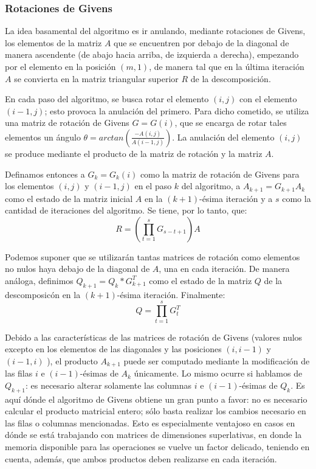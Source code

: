 \documentclass[journal, monochrome]{IEEEtran}
\begin{document}
\vspace{0.5cm}
\subsubsection{Rotaciones de Givens}
\par
La idea basamental del algoritmo es ir anulando, mediante rotaciones de Givens, los elementos de la matriz $A$ que se encuentren por debajo de la diagonal
de manera ascendente (de abajo hacia arriba, de izquierda a derecha), empezando por el elemento en la posición $(m,1)$, de manera
tal que en la última iteración $A$ se convierta en la matriz triangular superior $R$ de la descomposición.
\par
En cada paso del algoritmo, se busca rotar el elemento $(i,j)$ con el elemento $(i-1,j)$; esto provoca la anulación del primero.
Para dicho cometido, se utiliza una matriz de rotación de Givens $G = G(i)$, que se encarga de rotar tales elementos un
ángulo $\theta = arctan(\frac{-A(i,j)}{A(i-1,j)})$. La anulación del elemento $(i,j)$ se produce mediante el producto de la matriz de rotación y la matriz $A$.
\par
Definamos entonces a $G_k = G_k(i)$ como la matriz de rotación de Givens para los elementos $(i,j)$ y $(i-1,j)$ en el paso $k$ del algoritmo, a
$A_{k+1} = G_{k+1} A_k$ como el estado de la matriz inicial $A$ en la $(k+1)$-ésima iteración
y a $s$ como la cantidad de iteraciones del algoritmo. Se tiene, por lo tanto, que:
\begin{equation}
  R = (\displaystyle\prod_{t=1}^s G_{s-t+1}) A
\end{equation}

\par
Podemos suponer que se utilizarán tantas matrices de rotación como elementos no nulos haya debajo de la diagonal de $A$, una en cada iteración.
De manera análoga, definimos $Q_{k+1} = Q_k * G_{k+1}^T$ como el estado de la matriz $Q$ de la descomposicón en la $(k+1)$-ésima iteración. Finalmente:
\begin{equation}
Q = \displaystyle\prod_{t=1}^s G_{t}^T
\end{equation}

\par
Debido a las características de las matrices de rotación de Givens (valores nulos excepto en los elementos de las diagonales y las posiciones $(i, i-1)$ y $(i-1,i)$ ),
el producto $A_{k+1}$ puede ser computado mediante la modificación de las filas $i$ e $(i-1)$-ésimas de $A_k$ únicamente. Lo mismo ocurre si hablamos de $Q_{k+1}$: es necesario alterar
solamente las columnas $i$ e $(i-1)$-ésimas de $Q_{k}$. Es aquí dónde el algoritmo de Givens obtiene un gran punto a favor: no es necesario
calcular el producto matricial entero; sólo basta realizar los cambios necesario en las filas o columnas mencionadas. Esto es especialmente ventajoso
en casos en dónde se está trabajando con matrices de dimensiones superlativas, en donde la memoria disponible para las operaciones se vuelve un factor delicado, teniendo
en cuenta, además, que ambos productos deben realizarse en cada iteración.
\end{document}
